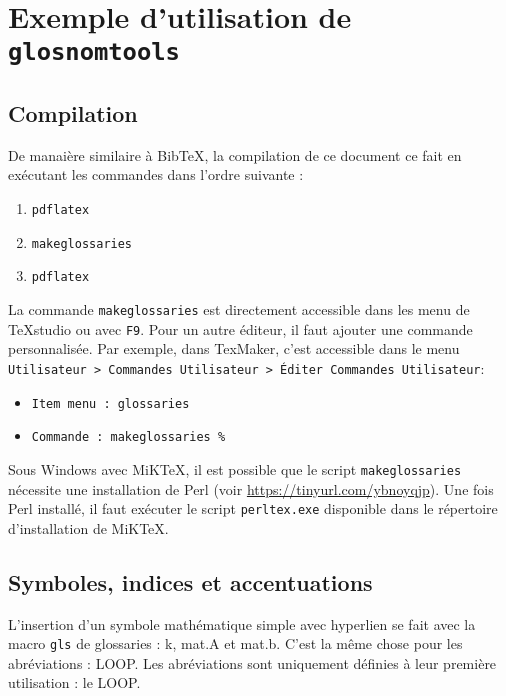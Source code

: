 \documentclass[PhD,nohyperref,english,french]{ulthese}
\begin{document}
\frontmatter                    %

\pagetitre

\begin{SingleSpace}
\abnormalparskip{0pt}
\printglossary[title=Nomenclature]
\end{SingleSpace}

\mainmatter                     %

\chapter{Exemple d'utilisation de \texttt{glosnomtools}}

\section{Compilation}
De manaière similaire à BibTeX, la compilation de ce document ce fait en exécutant les commandes dans l'ordre suivante :
\begin{enumerate}
	\item \texttt{pdflatex}
	\item \texttt{makeglossaries}
	\item \texttt{pdflatex}
\end{enumerate}
La commande \texttt{makeglossaries} est directement accessible dans les menu de TeXstudio ou avec \texttt{F9}. Pour un autre éditeur, il faut ajouter une commande personnalisée. Par exemple, dans TexMaker, c’est accessible dans le menu \texttt{Utilisateur > Commandes Utilisateur > Éditer Commandes Utilisateur}:
\begin{itemize}
	\item \texttt{Item menu : glossaries} 
	\item \texttt{Commande : makeglossaries \%}
\end{itemize}
Sous Windows avec MiKTeX, il est possible que le script \texttt{makeglossaries} nécessite une installation de Perl (voir \url{https://tinyurl.com/ybnoyqjp}). Une fois Perl installé, il faut exécuter le script \texttt{perltex.exe} disponible dans le répertoire d'installation de MiKTeX.

\section{Symboles, indices et accentuations}
L'insertion d'un symbole mathématique simple avec hyperlien se fait avec la macro \texttt{gls} de glossaries : \gls{k}, \gls{mat.A} et \gls{mat.b}. C'est la même chose pour les abréviations : \gls{LOOP}. Les abréviations sont uniquement définies à leur première utilisation : le \gls{LOOP}.
\end{document}

